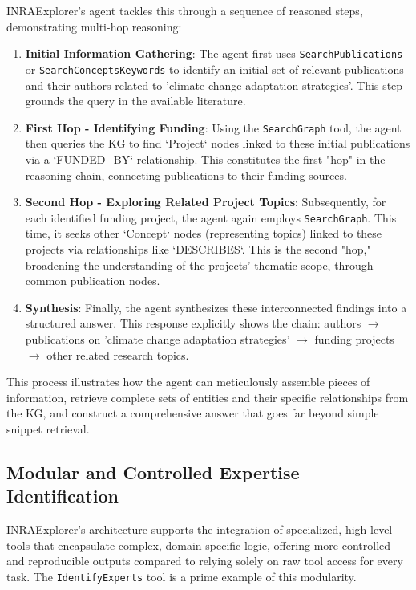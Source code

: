 \documentclass{ecai}
\begin{document}
INRAExplorer's agent tackles this through a sequence of reasoned steps, demonstrating multi-hop reasoning:
\begin{enumerate}
    \item \textbf{Initial Information Gathering}: The agent first uses \texttt{SearchPublications} or \texttt{SearchConceptsKeywords} to identify an initial set of relevant publications and their authors related to 'climate change adaptation strategies'. This step grounds the query in the available literature.
    \item \textbf{First Hop - Identifying Funding}: Using the \texttt{SearchGraph} tool, the agent then queries the KG to find `Project` nodes linked to these initial publications via a `FUNDED\_BY` relationship. This constitutes the first "hop" in the reasoning chain, connecting publications to their funding sources.
    \item \textbf{Second Hop - Exploring Related Project Topics}: Subsequently, for each identified funding project, the agent again employs \texttt{SearchGraph}. This time, it seeks other `Concept` nodes (representing topics) linked to these projects via relationships like `DESCRIBES`. This is the second "hop," broadening the understanding of the projects' thematic scope, through common publication nodes.
    \item \textbf{Synthesis}: Finally, the agent synthesizes these interconnected findings into a structured answer. This response explicitly shows the chain: authors $\rightarrow$ publications on 'climate change adaptation strategies' $\rightarrow$ funding projects $\rightarrow$ other related research topics.
\end{enumerate}
This process illustrates how the agent can meticulously assemble pieces of information, retrieve complete sets of entities and their specific relationships from the KG, and construct a comprehensive answer that goes far beyond simple snippet retrieval.

\subsection{Modular and Controlled Expertise Identification}

INRAExplorer's architecture supports the integration of specialized, high-level tools that encapsulate complex, domain-specific logic, offering more controlled and reproducible outputs compared to relying solely on raw tool access for every task. The \texttt{IdentifyExperts} tool is a prime example of this modularity.
\end{document}
